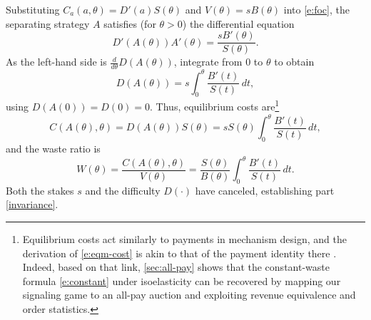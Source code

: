 \documentclass[12 pt]{article}
\makeatletter
\newenvironment{proof}[1][Proof]{\noindent\textbf{#1} }{\ \rule{0.5em}{0.5em}}
\theoremstyle{remark}
\theoremstyle{definition}
\renewenvironment{proof}[1][\proofname] {\par\pushQED{\qed}\normalfont\topsep6\p@\@plus6\p@\relax\trivlist\item[\hskip\labelsep\bfseries#1\@addpunct{.}]\ignorespaces}{\popQED\endtrivlist\@endpefalse}
\let\oldfootnote\footnote
\renewcommand\footnote[1]{\oldfootnote{\hspace{.5mm}#1}}
\makeatother
\begin{document}
\begin{proof}[Proof of \autoref{thm:constant}]
Substituting $C_a(a,\theta)=D'(a) S(\theta)$ and $V(\theta) = s B(\theta)$ into \autoref{e:foc}, the separating strategy $A$ satisfies (for $\theta>0$) the differential equation
\[
D'(A(\theta)) A'(\theta) = \frac{s B'(\theta)}{S(\theta)}.
\]
As the left-hand side is $\frac{d}{d\theta} D(A(\theta))$, integrate from $0$ to $\theta$ to obtain
\[
D(A(\theta))= s\int_0^\theta \frac{B'(t)}{S(t)} \, dt,
\]
using $D(A(0))=D(0)=0$.
Thus, equilibrium costs are\footnote{Equilibrium costs act similarly to payments in mechanism design, and the derivation of \autoref{e:eqm-cost} is akin to that of the payment identity there \citep{Myerson81}. Indeed, based on that link, \autoref{sec:all-pay} shows that the constant-waste formula \eqref{e:constant} under isoelasticity can be recovered by mapping our signaling game to an all-pay auction and exploiting revenue equivalence and order statistics.}
\begin{equation}
\label{e:eqm-cost}
C(A(\theta), \theta) = D(A(\theta)) S(\theta)=s S(\theta) \int_0^\theta \frac{B'(t)}{S(t)} \, dt,
\end{equation}
and the waste ratio is
\begin{equation}
\label{e:invariance}
W(\theta) = \frac{C(A(\theta),\theta)}{V(\theta)} = \frac{S(\theta)}{B(\theta)} \int_0^\theta \frac{B'(t)}{S(t)} \, dt.
\end{equation}
Both the stakes $s$ and the difficulty $D(\cdot)$ have canceled, establishing part \ref{invariance}. 

\end{proof}
\end{document}
